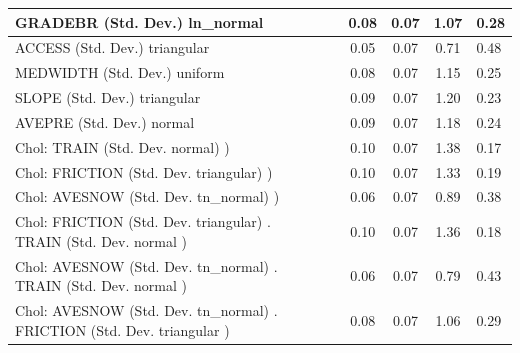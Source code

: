 \begin{table}
\begin{center}
\begin{tabular}{|l|l|c|c|c|l|}
			\hline
			GRADEBR (Std. Dev.) ln_normal &  & 0.08 & 0.07 & 1.07 & 0.28 \\
			\hline
			ACCESS (Std. Dev.) triangular &  & 0.05 & 0.07 & 0.71 & 0.48 \\
			\hline
			MEDWIDTH (Std. Dev.) uniform &  & 0.08 & 0.07 & 1.15 & 0.25 \\
			\hline
			SLOPE (Std. Dev.) triangular &  & 0.09 & 0.07 & 1.20 & 0.23 \\
			\hline
			AVEPRE (Std. Dev.) normal &  & 0.09 & 0.07 & 1.18 & 0.24 \\
			\hline
			 Chol: TRAIN (Std. Dev. normal) ) &  & 0.10 & 0.07 & 1.38 & 0.17 \\
			\hline
			 Chol: FRICTION (Std. Dev. triangular) ) &  & 0.10 & 0.07 & 1.33 & 0.19 \\
			\hline
			 Chol: AVESNOW (Std. Dev. tn_normal) ) &  & 0.06 & 0.07 & 0.89 & 0.38 \\
			\hline
			 Chol: FRICTION (Std. Dev. triangular) . TRAIN (Std. Dev.   normal ) &  & 0.10 & 0.07 & 1.36 & 0.18 \\
			\hline
			 Chol: AVESNOW (Std. Dev. tn_normal) . TRAIN (Std. Dev.   normal ) &  & 0.06 & 0.07 & 0.79 & 0.43 \\
			\hline
			 Chol: AVESNOW (Std. Dev. tn_normal) . FRICTION (Std. Dev.   triangular ) &  & 0.08 & 0.07 & 1.06 & 0.29 \\
			\hline
		\end{tabular}
	\end{center}
\end{table}